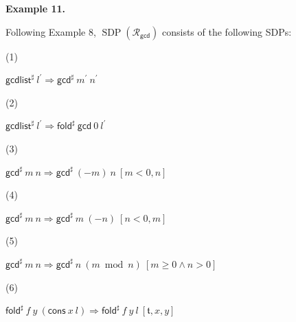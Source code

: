  
 
\par\medskip\noindent\textbf{Example 11.}\par
 
 
Following Example 8, $\operatorname{SDP}(\mathcal{R}_{\mathsf{gcd}})$ consists of the following SDPs:\par
  
\par\noindent  (1) 
 
${{\mathsf{gcdlist}^{\sharp}}\ {l^{\prime}}}\Rightarrow{{{\mathsf{gcd}^{\sharp}}\ {m^{\prime}}}\ {n^{\prime}}}$\par
 
 
 
\par\noindent  (2) 
 
${{\mathsf{gcdlist}^{\sharp}}\ {l^{\prime}}}\Rightarrow{{{{\mathsf{fold}^{\sharp}}\ {\mathsf{gcd}}}\ {0}}\ {l^{\prime}}}$\par
 
 
 
\par\noindent  (3) 
 
${{{\mathsf{gcd}^{\sharp}}\ {m}}\ {n}}\Rightarrow{{{\mathsf{gcd}^{\sharp}}\ {(-m)}}\ {n}}\ [m<0,n]$\par
 
 
 
\par\noindent  (4) 
 
${{{\mathsf{gcd}^{\sharp}}\ {m}}\ {n}}\Rightarrow{{{\mathsf{gcd}^{\sharp}}\ {m}}\ {(-n)}}\ [n<0,m]$\par
 
 
 
\par\noindent  (5) 
 
${{{\mathsf{gcd}^{\sharp}}\ {m}}\ {n}}\Rightarrow{{{\mathsf{gcd}^{\sharp}}\ {n}}\ {(m\bmod n)}}\ [m\geq 0\wedge n>0]$\par
 
 
 
\par\noindent  (6) 
 
${{{{\mathsf{fold}^{\sharp}}\ {f}}\ {y}}\ {({{\mathsf{cons}}\ {x}}\ {l})}}\Rightarrow{{{{\mathsf{fold}^{\sharp}}\ {f}}\ {y}}\ {l}}\ [\mathfrak{t},x,y]$\par
 
